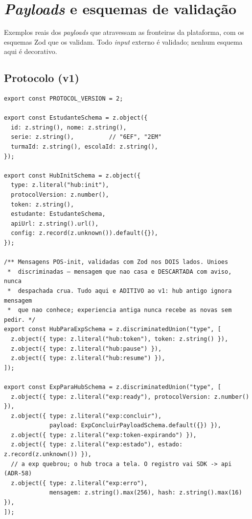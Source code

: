 \chapter{\emph{Payloads} e esquemas de validação}
\label{ap:payloads}

Exemplos reais dos \emph{payloads} que atravessam as fronteiras da plataforma, com
os esquemas Zod que os validam. Todo \emph{input} externo é validado; nenhum
esquema aqui é decorativo.

\section{Protocolo  (v1)}

\begin{lstlisting}[language=tsunoo, caption={\arq{packages/sdk/src/types.ts} --- os esquemas do protocolo}]
export const PROTOCOL_VERSION = 2;

export const EstudanteSchema = z.object({
  id: z.string(), nome: z.string(),
  serie: z.string(),          // "6EF", "2EM"
  turmaId: z.string(), escolaId: z.string(),
});

export const HubInitSchema = z.object({
  type: z.literal("hub:init"),
  protocolVersion: z.number(),
  token: z.string(),
  estudante: EstudanteSchema,
  apiUrl: z.string().url(),
  config: z.record(z.unknown()).default({}),
});

/** Mensagens POS-init, validadas com Zod nos DOIS lados. Unioes
 *  discriminadas — mensagem que nao casa e DESCARTADA com aviso, nunca
 *  despachada crua. Tudo aqui e ADITIVO ao v1: hub antigo ignora mensagem
 *  que nao conhece; experiencia antiga nunca recebe as novas sem pedir. */
export const HubParaExpSchema = z.discriminatedUnion("type", [
  z.object({ type: z.literal("hub:token"), token: z.string() }),
  z.object({ type: z.literal("hub:pause") }),
  z.object({ type: z.literal("hub:resume") }),
]);

export const ExpParaHubSchema = z.discriminatedUnion("type", [
  z.object({ type: z.literal("exp:ready"), protocolVersion: z.number() }),
  z.object({ type: z.literal("exp:concluir"),
             payload: ExpConcluirPayloadSchema.default({}) }),
  z.object({ type: z.literal("exp:token-expirando") }),
  z.object({ type: z.literal("exp:estado"), estado: z.record(z.unknown()) }),
  // a exp quebrou; o hub troca a tela. O registro vai SDK -> api (ADR-58)
  z.object({ type: z.literal("exp:erro"),
             mensagem: z.string().max(256), hash: z.string().max(16) }),
]);
\end{lstlisting}

